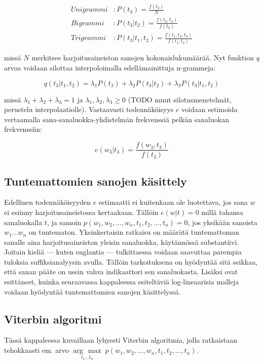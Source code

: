 \documentclass[utf8,bachelor,manualbib]{gradu3}
\newcommand{\argmax}[1]{\underset{#1}{\operatorname{arg}\,\operatorname{max}}\;}
\begin{document}
\begin{align*}
Unigrammi&: P(t_3) = \frac{f(t_3)}{N} \\
Bigrammi&: P(t_3 | t_2) = \frac{f(t_2, t_3)}{f(t_2)} \\
Trigrammi&: P(t_3 | t_1, t_2) = \frac{f(t_1,t_2,t_3)}{f(t_1,t_2)}
\end{align*}

missä $N$ merkitsee harjoitusaineiston sanojen kokonaislukumäärää. Nyt funktion $q$ arvoa voidaan silottaa interpoloimalla edellämainittuja n-grammeja:

\[
q(t_3 | t_1, t_2) = \lambda_1 P(t_3) + \lambda_2 P(t_3 | t_2) + \lambda_3 P(t_3 | t_1, t_2)
\]

missä $\lambda_1+\lambda_2+\lambda_3 = 1$ ja $\lambda_1,\lambda_2,\lambda_3 \geq 0$ (TODO muut silotusmenetelmät, perustelu interpolaatiolle). Vastaavasti todennäköisyys $e$ voidaan estimoida vertaamalla sana-sanaluokka-yhdistelmän frekvenssiä pelkän sanaluokan frekvenssiin:

\[
e(w_3|t_3) = \frac{f(w_3, t_3)}{f(t_3)}
\]

\subsection{Tuntemattomien sanojen käsittely}

Edellinen todennäköisyyden $e$ estimaatti ei kuitenkaan ole luotettava, jos sana $w$ ei esiinny harjoitusaineistossa kertaakaan. Tällöin $e(w|t)=0$ millä tahansa sanaluokalla $t$, ja samoin 
$p(w_1, w_2, \ldots, w_n, t_1, t_2, \ldots, t_n) = 0$, jos yksikään sanoista $w_1 \ldots w_n$ on tuntematon. Yksinkertaisin ratkaisu on määrätä tuntemattoman sanalle aina harjoitusaineiston yleisin sanaluokka, käytännössä substantiivi. Joitain kieliä --- kuten englantia --- tulkittaessa voidaan saavuttaa parempia tuloksia suffiksianalyysin \citep{samuelsson1993} avulla. Tällöin tarkoituksena on hyödyntää sitä seikkaa, että sanan pääte on usein vahva indikaattori sen sanaluokasta. Lisäksi \citet{toutanova2003} ovat esittäneet, kuinka seuraavassa kappaleessa esiteltäviä log-lineaarisia malleja voidaan hyödyntää tuntemattomien sanojen käsittelyssä.


\subsection{Viterbin algoritmi}

Tässä kappaleessa kuvaillaan lyhyesti Viterbin algoritmia, jolla ratkaistaan tehokkaasti em. arvo $\argmax{t_1 \ldots t_n} p(w_1, w_2, \ldots, w_n, t_1, t_2, \ldots, t_n)$.
\end{document}
